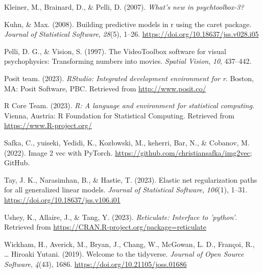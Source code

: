 \documentclass[
  man,floatsintext]{apa6}
\newlength{\cslhangindent}
\newlength{\cslentryspacingunit} %
\newenvironment{CSLReferences}[2] %
 {%
  \setlength{\parindent}{0pt}
  \ifodd #1
  \let\oldpar\par
  \def\par{\hangindent=\cslhangindent\oldpar}
  \fi
  \setlength{\parskip}{#2\cslentryspacingunit}
 }%
 {}
\begin{document}
\begin{CSLReferences}{1}{0}
\leavevmode{}%
Kleiner, M., Brainard, D., \& Pelli, D. (2007). \emph{What's new in psychtoolbox-3?}

\leavevmode{}%
Kuhn, \& Max. (2008). Building predictive models in r using the caret package. \emph{Journal of Statistical Software}, \emph{28}(5), 1--26. \url{https://doi.org/10.18637/jss.v028.i05}

\leavevmode{}%
Pelli, D. G., \& Vision, S. (1997). The VideoToolbox software for visual psychophysics: Transforming numbers into movies. \emph{Spatial Vision}, \emph{10}, 437--442.

\leavevmode{}%
Posit team. (2023). \emph{RStudio: Integrated development environment for r}. Boston, MA: Posit Software, PBC. Retrieved from \url{http://www.posit.co/}

\leavevmode{}%
R Core Team. (2023). \emph{R: A language and environment for statistical computing}. Vienna, Austria: R Foundation for Statistical Computing. Retrieved from \url{https://www.R-project.org/}

\leavevmode{}%
Safka, C., yuiseki, Yedidi, K., Kozłowski, M., keherri, Bar, N., \& Cobanov, M. (2022). Image 2 vec with PyTorch. \url{https://github.com/christiansafka/img2vec}; GitHub.

\leavevmode{}%
Tay, J. K., Narasimhan, B., \& Hastie, T. (2023). Elastic net regularization paths for all generalized linear models. \emph{Journal of Statistical Software}, \emph{106}(1), 1--31. \url{https://doi.org/10.18637/jss.v106.i01}

\leavevmode{}%
Ushey, K., Allaire, J., \& Tang, Y. (2023). \emph{Reticulate: Interface to 'python'}. Retrieved from \url{https://CRAN.R-project.org/package=reticulate}

\leavevmode{}%
Wickham, H., Averick, M., Bryan, J., Chang, W., McGowan, L. D., Françoi, R., \ldots{} Hiroaki Yutani. (2019). Welcome to the {tidyverse}. \emph{Journal of Open Source Software}, \emph{4}(43), 1686. \url{https://doi.org/10.21105/joss.01686}

\end{CSLReferences}
\end{document}
